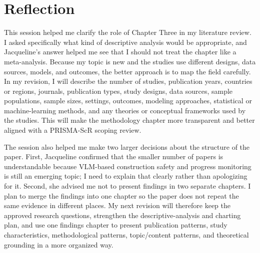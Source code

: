 \documentclass[11pt]{article}
\begin{document}
\section*{Reflection}

This session helped me clarify the role of Chapter Three in my literature review. I asked specifically what kind of descriptive analysis would be appropriate, and Jacqueline's answer helped me see that I should not treat the chapter like a meta-analysis. Because my topic is new and the studies use different designs, data sources, models, and outcomes, the better approach is to map the field carefully. In my revision, I will describe the number of studies, publication years, countries or regions, journals, publication types, study designs, data sources, sample populations, sample sizes, settings, outcomes, modeling approaches, statistical or machine-learning methods, and any theories or conceptual frameworks used by the studies. This will make the methodology chapter more transparent and better aligned with a PRISMA-ScR scoping review.

The session also helped me make two larger decisions about the structure of the paper. First, Jacqueline confirmed that the smaller number of papers is understandable because VLM-based construction safety and progress monitoring is still an emerging topic; I need to explain that clearly rather than apologizing for it. Second, she advised me not to present findings in two separate chapters. I plan to merge the findings into one chapter so the paper does not repeat the same evidence in different places. My next revision will therefore keep the approved research questions, strengthen the descriptive-analysis and charting plan, and use one findings chapter to present publication patterns, study characteristics, methodological patterns, topic/content patterns, and theoretical grounding in a more organized way.

\clearpage

\end{document}
